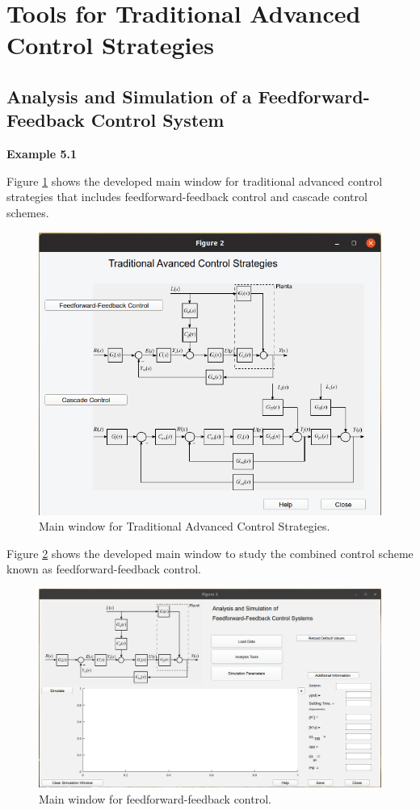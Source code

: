 \section{Tools for Traditional Advanced Control Strategies}

\subsection{Analysis and Simulation of a Feedforward-Feedback Control System}

\textbf{Example 5.1}

Figure \ref{chpECA_fig01_ejemECA} shows the developed main window for traditional advanced control strategies that includes feedforward-feedback control and cascade control schemes.

\begin{figure}[H]
	\centering
	\includegraphics[scale=0.5]{./figuras/chapter_eca/fig01EjemECA.png}
	\caption{Main window for Traditional Advanced Control Strategies.}
	\label{chpECA_fig01_ejemECA}
\end{figure}

Figure \ref{chpECA_fig02_ejemECA} shows the developed main window to study the combined control scheme known as feedforward-feedback control.
\begin{figure}[H]
	\centering
	\includegraphics[scale=0.5]{./figuras/chapter_eca/fig02EjemECA.png}
	\caption{Main window for feedforward-feedback control.}
	\label{chpECA_fig02_ejemECA}
\end{figure}

